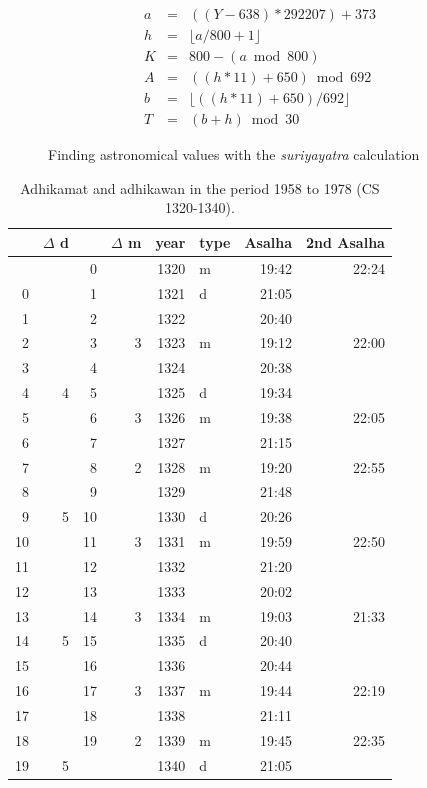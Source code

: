 \documentclass[11pt,oneside]{memoir-article}
\begin{document}
\begin{figure}
\caption{\label{fig-suriyayatra}Finding astronomical values with the \emph{suriyayatra} calculation\cite{eade-interpolation}}
\begin{eqnarray}
a & = & ((Y - 638) * 292207) + 373 \\
h & = & \lfloor a/800 + 1 \rfloor \\
K & = & 800 - (a \bmod 800) \\
A & = & ((h*11) + 650) \bmod 692 \\
b & = & \lfloor ((h*11) + 650) / 692 \rfloor \\
T & = & (b + h) \bmod 30
\end{eqnarray}
\end{figure}

\begin{table}[p]
\caption{Adhikamat and adhikawan in the period 1958 to 1978 (CS 1320-1340).\cite{eade-interpolation}}
\centering
\begin{tabular}{rrrrrlrr}
 & $\Delta$ d &  & $\Delta$ m & year & type & Asalha & 2nd Asalha\\
\hline
 &  & 0 &  & 1320 & m & 19:42 & 22:24\\
0 &  & 1 &  & 1321 & d & 21:05 & \\
1 &  & 2 &  & 1322 &  & 20:40 & \\
2 &  & 3 & 3 & 1323 & m & 19:12 & 22:00\\
3 &  & 4 &  & 1324 &  & 20:38 & \\
4 & 4 & 5 &  & 1325 & d & 19:34 & \\
5 &  & 6 & 3 & 1326 & m & 19:38 & 22:05\\
6 &  & 7 &  & 1327 &  & 21:15 & \\
7 &  & 8 & 2 & 1328 & m & 19:20 & 22:55\\
8 &  & 9 &  & 1329 &  & 21:48 & \\
9 & 5 & 10 &  & 1330 & d & 20:26 & \\
10 &  & 11 & 3 & 1331 & m & 19:59 & 22:50\\
11 &  & 12 &  & 1332 &  & 21:20 & \\
12 &  & 13 &  & 1333 &  & 20:02 & \\
13 &  & 14 & 3 & 1334 & m & 19:03 & 21:33\\
14 & 5 & 15 &  & 1335 & d & 20:40 & \\
15 &  & 16 &  & 1336 &  & 20:44 & \\
16 &  & 17 & 3 & 1337 & m & 19:44 & 22:19\\
17 &  & 18 &  & 1338 &  & 21:11 & \\
18 &  & 19 & 2 & 1339 & m & 19:45 & 22:35\\
19 & 5 &  &  & 1340 & d & 21:05 & \\
\end{tabular}
\end{table}
\end{document}
